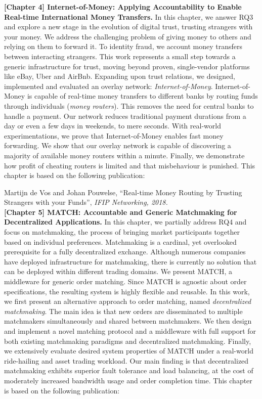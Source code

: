 \textbf{[Chapter 4] Internet-of-Money: Applying Accountability to Enable Real-time International Money Transfers.}
In this chapter, we answer RQ3 and explore a new stage in the evolution of digital trust, trusting strangers with your money.
We address the challenging problem of giving money to others and relying on them to forward it.
To identity fraud, we account money transfers between interacting strangers.
This work represents a small step towards a generic infrastructure for trust, moving beyond proven, single-vendor platforms like eBay, Uber and AirBnb.
Expanding upon trust relations, we designed, implemented and evaluated an overlay network: \emph{Internet-of-Money}.
Internet-of-Money is capable of real-time money transfers to different banks by routing funds through individuals (\emph{money routers}).
This removes the need for central banks to handle a payment.
Our network reduces traditional payment durations from a day or even a few days in weekends, to mere seconds.
With real-world experimentations, we prove that Internet-of-Money enables fast money forwarding.
We show that our overlay network is capable of discovering a majority of available money routers within a minute.
Finally, we demonstrate how profit of cheating routers is limited and that misbehaviour is punished.
This chapter is based on the following publication:

Martijn de Vos and Johan Pouwelse, \enquote{Real-time Money Routing by Trusting Strangers with your Funds}, \emph{IFIP Networking, 2018.}\\

\textbf{[Chapter 5] MATCH: Accountable and Generic Matchmaking for Decentralized Applications.}
In this chapter, we partially address RQ4 and focus on matchmaking, the process of bringing market participants together based on individual preferences.
Matchmaking is a cardinal, yet overlooked prerequisite for a fully decentralized exchange.
Although numerous companies have deployed infrastructure for matchmaking, there is currently no solution that can be deployed within different trading domains.
We present MATCH, a middleware for generic order matching.
Since MATCH is agnostic about order specifications, the resulting system is highly flexible and reusable.
In this work, we first present an alternative approach to order matching, named \emph{decentralized matchmaking}.
The main idea is that new orders are disseminated to multiple matchmakers simultaneously and shared between matchmakers.
We then design and implement a novel matching protocol and a middleware with full support for both existing matchmaking paradigms and decentralized matchmaking.
Finally, we extensively evaluate desired system properties of MATCH under a real-world ride-hailing and asset trading workload.
Our main finding is that decentralized matchmaking exhibits superior fault tolerance and load balancing, at the cost of moderately increased bandwidth usage and order completion time.
This chapter is based on the following publication:

